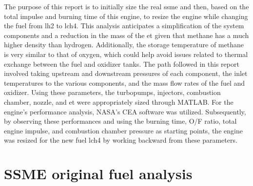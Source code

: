 
The purpose of this report is to initially size the real \acrfull{ssme} and then, based on the total impulse and burning time of this engine, to resize the engine while changing the fuel from \acrlong{lh2} to \acrfull{lch4}. 
This analysis anticipates a simplification of the system components and a reduction in the mass of the \acrfull{et} given that methane has a much higher density than hydrogen. Additionally, the storage temperature of methane is very similar to that of oxygen, which could help avoid issues related to thermal exchange between the fuel and oxidizer tanks.
The path followed in this report involved taking upstream and downstream pressures of each component, the inlet temperatures to the various components, and the mass flow rates of the fuel and oxidizer. Using these parameters, the turbopumps, injectors, combustion chamber, nozzle, and \acrlong{et} were appropriately sized through MATLAB. For the engine's performance analysis, NASA's CEA software was utilized. Subsequently, by observing these performances and using the burning time, O/F ratio, total engine impulse, and combustion chamber pressure as starting points, the engine was resized for the new fuel \acrshort{lch4} by working backward from these parameters.
\section{SSME original fuel analysis}

